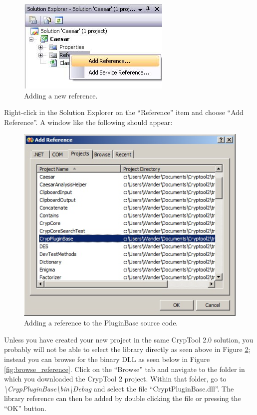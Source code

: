 \begin{figure}[h!]
	\includegraphics{figures/add_reference.jpg}
	\caption{Adding a new reference.}
	\label{fig:add_reference}
\end{figure}

\noindent Right-click in the Solution Explorer on the ``Reference'' item and choose ``Add Reference''. A window like the following should appear:

\begin{figure}[h!]
	\centering
		\includegraphics{figures/add_pluginbase_source.jpg}
	\caption{Adding a reference to the PluginBase source code.}
	\label{fig:add_pluginbase_source}
\end{figure}
\clearpage

\noindent Unless you have created your new project in the same CrypTool 2.0 solution, you probably will not be able to select the library directly as seen above in Figure \ref{fig:add_pluginbase_source}; instead you can browse for the binary DLL as seen below in Figure \ref{fig:browse_reference}. Click on the ``Browse'' tab and navigate to the folder in which you downloaded the CrypTool 2 project. Within that folder, go to \textit{\textbackslash CrypPluginBase\textbackslash bin\textbackslash Debug} and select the file ``CryptPluginBase.dll''. The library reference can then be added by double clicking the file or pressing the ``OK'' button.

